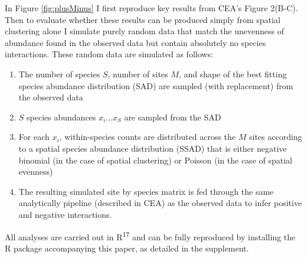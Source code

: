 \documentclass[]{article}
\providecommand{\tightlist}{%
  \setlength{\itemsep}{0pt}\setlength{\parskip}{0pt}}
\begin{document}
In Figure \ref{fig:plusMinus} I first reproduce key results from CEA's
Figure 2(B-C). Then to evaluate whether these results can be produced
simply from spatial clustering alone I simulate purely random data that
match the unevenness of abundance found in the observed data but contain
absolutely no species interactions. These random data are simulated as
follows:

\begin{enumerate}
\def\labelenumi{\arabic{enumi})}
\tightlist
\item
  The number of species \(S\), number of sites \(M\), and shape of the
  best fitting species abundance distribution (SAD) are sampled (with
  replacement) from the observed data
\item
  \(S\) species abundances \(x_i \ldots x_S\) are sampled from the SAD
\item
  For each \(x_i\), within-species counts are distributed across the
  \(M\) sites according to a spatial species abundance distribution
  (SSAD) that is either negative binomial (in the case of spatial
  clustering) or Poisson (in the case of spatial evenness)
\item
  The resulting simulated site by species matrix is fed through the same
  analytically pipeline (described in CEA) as the observed data to infer
  positive and negative interactions.
\end{enumerate}

All analyses are carried out in R\textsuperscript{17} and can be fully
reproduced by installing the R package accompanying this paper, as
detailed in the supplement.
\end{document}
